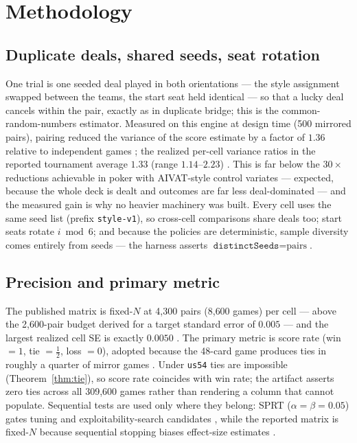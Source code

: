 \documentclass[11pt]{article}
\newcommand{\code}[1]{\texttt{#1}}
\newcommand{\usff}{\code{us54}}
\begin{document}
\section{Methodology}
\label{sec:method}

\subsection{Duplicate deals, shared seeds, seat rotation}
\label{sec:duplicate}

One trial is one seeded deal played in both orientations --- the style assignment swapped
between the teams, the start seat held identical --- so that a lucky deal cancels within the
pair, exactly as in duplicate bridge; this is the common-random-numbers estimator. Measured on
this engine at design time (500 mirrored pairs), pairing reduced the variance of the score
estimate by a factor of $1.36$ relative to independent games \cite{botlab}; the realized
per-cell variance ratios in the reported tournament average $1.33$ (range $1.14$--$2.23$)
\cite{artifact}. This is far below the $30\times$ reductions achievable in poker with
AIVAT-style control variates \cite{burch2018} --- expected, because the whole deck is dealt
and outcomes are far less deal-dominated --- and the measured gain is why no heavier machinery
was built. Every cell uses the same seed list (prefix \code{style-v1}), so cross-cell
comparisons share deals too; start seats rotate $i \bmod 6$; and because the policies are
deterministic, sample diversity comes entirely from seeds --- the harness asserts
$\code{distinctSeeds} = \text{pairs}$.

\subsection{Precision and primary metric}

The published matrix is fixed-$N$ at 4{,}300 pairs (8{,}600 games) per cell --- above the
2{,}600-pair budget derived for a target standard error of $0.005$ --- and the largest
realized cell SE is exactly $0.0050$ \cite{artifact}. The primary metric is score rate (win
$=1$, tie $=\tfrac12$, loss $=0$), adopted because the 48-card game produces ties in roughly a
quarter of mirror games \cite{botlab}. Under \usff{} ties are impossible
(Theorem~\ref{thm:tie}), so score rate coincides with win rate; the artifact asserts zero ties
across all 309{,}600 games rather than rendering a column that cannot populate. Sequential
tests are used only where they belong: SPRT ($\alpha=\beta=0.05$) gates tuning and
exploitability-search candidates \cite{wald1945}, while the reported matrix is fixed-$N$
because sequential stopping biases effect-size estimates \cite{botlab}.
\end{document}
